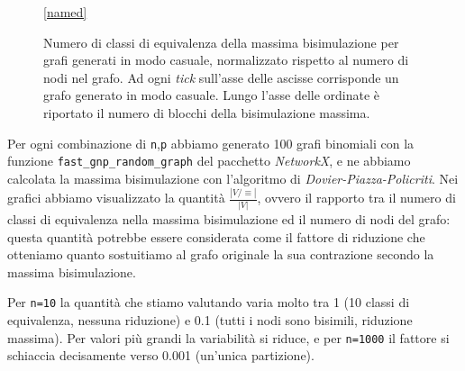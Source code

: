 \begin{figure}[t!]
\begin{center}
\begin{subfigure}[b]{0.3\textwidth}
        \end{subfigure}
        \ref*{named}
    \end{center}
    \caption{Numero di classi di equivalenza della massima bisimulazione per grafi generati in modo casuale, normalizzato rispetto al numero di nodi nel grafo. Ad ogni \emph{tick} sull'asse delle ascisse corrisponde un grafo generato in modo casuale. Lungo l'asse delle ordinate è riportato il numero di blocchi della bisimulazione massima.}
    \label{fig:bisi_size}
\end{figure}

Per ogni combinazione di \verb|n|,\verb|p| abbiamo generato 100 grafi binomiali con la funzione \verb|fast_gnp_random_graph| del pacchetto \emph{NetworkX}, e ne abbiamo calcolata la massima bisimulazione con l'algoritmo di \emph{Dovier-Piazza-Policriti}. Nei grafici abbiamo visualizzato la quantità $\frac{|V / \equiv|}{|V|}$, ovvero il rapporto tra il numero di classi di equivalenza nella massima bisimulazione ed il numero di nodi del grafo: questa quantità potrebbe essere considerata come il fattore di riduzione che otteniamo quanto sostuitiamo al grafo originale la sua contrazione secondo la massima bisimulazione.

Per \verb|n=10| la quantità che stiamo valutando varia molto tra 1 (10 classi di equivalenza, nessuna riduzione) e 0.1 (tutti i nodi sono bisimili, riduzione massima). Per valori più grandi la variabilità si riduce, e per \verb|n=1000| il fattore si schiaccia decisamente verso 0.001 (un'unica partizione).
